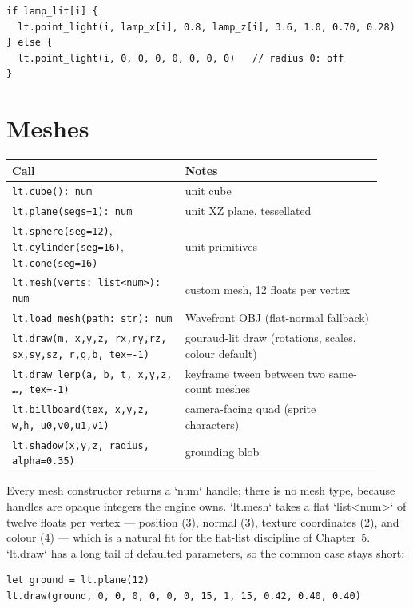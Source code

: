 \begin{lstlisting}[language=wick]
if lamp_lit[i] {
  lt.point_light(i, lamp_x[i], 0.8, lamp_z[i], 3.6, 1.0, 0.70, 0.28)
} else {
  lt.point_light(i, 0, 0, 0, 0, 0, 0, 0)   // radius 0: off
}
\end{lstlisting}

\section{Meshes}

\begin{center}
\small\begin{tabular}{@{}p{0.43\linewidth}p{0.49\linewidth}@{}}
\toprule
\textbf{Call} & \textbf{Notes} \\
\midrule
\texttt{lt.cube(): num} & unit cube \\
\texttt{lt.plane(segs=1): num} & unit XZ plane, tessellated \\
\texttt{lt.sphere(seg=12)}, \texttt{lt.cylinder(seg=16)}, \texttt{lt.cone(seg=16)} & unit primitives \\
\texttt{lt.mesh(verts: list<num>): num} & custom mesh, 12 floats per vertex \\
\texttt{lt.load\_mesh(path: str): num} & Wavefront OBJ (flat-normal fallback) \\
\texttt{lt.draw(m, x,y,z, rx,ry,rz, sx,sy,sz, r,g,b, tex=-1)} & gouraud-lit draw (rotations, scales, colour default) \\
\texttt{lt.draw\_lerp(a, b, t, x,y,z, \ldots, tex=-1)} & keyframe tween between two same-count meshes \\
\texttt{lt.billboard(tex, x,y,z, w,h, u0,v0,u1,v1)} & camera-facing quad (sprite characters) \\
\texttt{lt.shadow(x,y,z, radius, alpha=0.35)} & grounding blob \\
\bottomrule
\end{tabular}
\end{center}

\noindent
Every mesh constructor returns a `num` handle; there is no mesh type, because
handles are opaque integers the engine owns. `lt.mesh` takes a flat
`list<num>` of twelve floats per vertex --- position (3), normal (3), texture
coordinates (2), and colour (4) --- which is a natural fit for the flat-list
discipline of Chapter~5. `lt.draw` has a long tail of defaulted parameters, so
the common case stays short:

\begin{lstlisting}[language=wick]
let ground = lt.plane(12)
lt.draw(ground, 0, 0, 0, 0, 0, 0, 15, 1, 15, 0.42, 0.40, 0.40)
\end{lstlisting}

